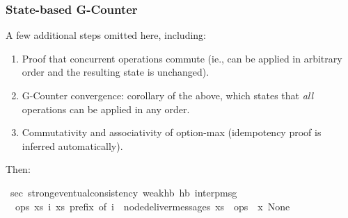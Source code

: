 \documentclass[aspectratio=169,compress,handout]{beamer}
\begin{document}
\begin{frame}
  \end{frame}

  \begin{frame}
    \frametitle{State-based G-Counter}

    A few additional steps omitted here, including:
    \begin{enumerate}[<+->]
      \item Proof that concurrent operations commute (ie., can be applied in
        arbitrary order and the resulting state is unchanged).
      \item G-Counter convergence: corollary of the above, which states that
        \emph{all} operations can be applied in any order.
      \item Commutativity and associativity of option-max (idempotency proof is
        inferred automatically).
    \end{enumerate}
    Then:
    \pause
    \vspace{1em}
    \begin{isabellebody}
    \isamarkupfalse%
    \ sec{\isacharcolon}\ strong{\isacharunderscore}eventual{\isacharunderscore}consistency\ weak{\isacharunderscore}hb\ hb\ interp{\isacharunderscore}msg\isanewline
    \ \ {\isachardoublequoteopen}{\isasymlambda}ops{\isachardot}\ {\isasymexists}xs\ i{\isachardot}\ xs\ prefix\ of\ i\ {\isasymand}\ node{\isacharunderscore}deliver{\isacharunderscore}messages\ xs\ {\isacharequal}\ ops{\isachardoublequoteclose}\ {\isachardoublequoteopen}{\isasymlambda}\ x{\isachardot}\ None{\isachardoublequoteclose}
    \end{isabellebody}
  \end{frame}
\end{document}
